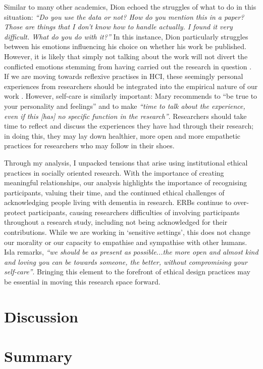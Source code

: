 Similar to many other academics, Dion echoed the struggles of what to do in this situation: \textit{“Do you use the data or not? How do you mention this in a paper? Those are things that I don’t know how to handle actually. I found it very difficult. What do you do with it?”} In this instance, Dion particularly struggles between his emotions influencing his choice on whether his work be published. However, it is likely that simply not talking about the work will not divert the conflicted emotions stemming from having carried out the research in question \citep{wacquant_for_2015}. If we are moving towards reflexive practises in HCI, these seemingly personal experiences from researchers should be integrated into the empirical nature of our work \citep{morrissey_value_2017}. However, self-care is similarly important: Mary recommends to “be true to your personality and feelings” and to make \textit{“time to talk about the experience, even if this [has] no specific function in the research”}. Researchers should take time to reflect and discuss the experiences they have had through their research; in doing this, they may lay down healthier, more open and more empathetic practices for researchers who may follow in their shoes.

Through my analysis, I unpacked tensions that arise using institutional ethical practices in socially oriented research. With the importance of creating meaningful relationships, our analysis highlights the importance of recognising participants, valuing their time, and the continued ethical challenges of acknowledging people living with dementia in research. ERBs continue to over-protect participants, causing researchers difficulties of involving participants throughout a research study, including not being acknowledged for their contributions. While we are working in ‘sensitive settings’, this does not change our morality or our capacity to empathise and sympathise with other humans. Isla remarks, \textit{“we should be as present as possible...the more open and almost kind and loving you can be towards someone, the better, without compromising your self-care”}. Bringing this element to the forefront of ethical design practices may be essential in moving this research space forward.

\section{Discussion}
\label{Ethics:Discussion}

\section{Summary}
\label{Ethics:Summary}